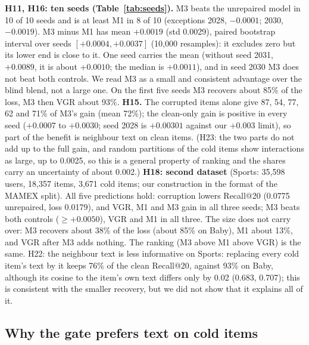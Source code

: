 \documentclass[conference]{IEEEtran}
\begin{document}
\textbf{H11, H16: ten seeds (Table~\ref{tab:seeds}).} M3 beats the unrepaired model in 10 of 10 seeds and is at least M1 in 8 of 10 (exceptions 2028, $-0.0001$; 2030, $-0.0019$). M3 minus M1 has mean $+0.0019$ (std 0.0029), paired bootstrap interval over seeds $[+0.0004, +0.0037]$ (10,000 resamples): it excludes zero but its lower end is close to it. One seed carries the mean (without seed 2031, $+0.0089$, it is about $+0.0010$; the median is $+0.0011$), and in seed 2030 M3 does not beat both controls. We read M3 as a small and consistent advantage over the blind blend, not a large one. On the first five seeds M3 recovers about 85\% of the loss, M3 then VGR about 93\%. \textbf{H15.} The corrupted items alone give 87, 54, 77, 62 and 71\% of M3's gain (mean 72\%); the clean-only gain is positive in every seed ($+0.0007$ to $+0.0030$; seed 2028 is $+0.00301$ against our $+0.003$ limit), so part of the benefit is neighbour text on clean items. (H23: the two parts do not add up to the full gain, and random partitions of the cold items show interactions as large, up to 0.0025, so this is a general property of ranking and the shares carry an uncertainty of about 0.002.) \textbf{H18: second dataset} (Sports: 35,598 users, 18,357 items, 3,671 cold items; our construction in the format of the MAMEX split). All five predictions hold: corruption lowers Recall@20 (0.0775 unrepaired, loss 0.0179), and VGR, M1 and M3 gain in all three seeds; M3 beats both controls ($\ge+0.0050$), VGR and M1 in all three. The size does not carry over: M3 recovers about 38\% of the loss (about 85\% on Baby), M1 about 13\%, and VGR after M3 adds nothing. The ranking (M3 above M1 above VGR) is the same. H22: the neighbour text is less informative on Sports: replacing every cold item's text by it keeps 76\% of the clean Recall@20, against 93\% on Baby, although its cosine to the item's own text differs only by 0.02 (0.683, 0.707); this is consistent with the smaller recovery, but we did not show that it explains all of it.

\subsection{Why the gate prefers text on cold items}
\end{document}
